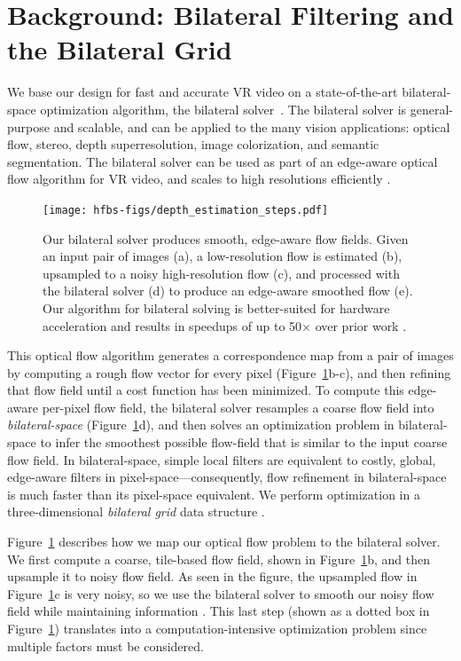 \section{Background: Bilateral Filtering and the Bilateral Grid}

\label{sec:hfbs-background}

We base our design for fast and accurate VR video on a state-of-the-art bilateral-space optimization algorithm, the bilateral solver~\cite{BarronPoole2016}.
The bilateral solver is general-purpose and scalable, and can be applied to the many vision applications: optical flow, stereo, depth superresolution, image colorization, and semantic segmentation.
The bilateral solver can be used as part of an edge-aware optical flow algorithm for VR video, and scales to high resolutions efficiently \cite{googlejump}.

  \begin{figure}[h]
		\centering
		\texttt{[image: hfbs-figs/depth\_estimation\_steps.pdf]}
		\caption{Our bilateral solver produces smooth, edge-aware flow fields.  Given an input pair of images (a), a low-resolution flow is estimated (b),  upsampled to a noisy high-resolution flow (c), and processed with the bilateral solver (d)  to produce an edge-aware smoothed flow (e). Our algorithm for bilateral solving is better-suited for hardware acceleration and results in speedups of up to 50$\times$ over prior work \cite{googlejump, BarronPoole2016}.}
		\label{fig:teaser}
  \end{figure}

This optical flow algorithm generates a correspondence map from a pair of images by computing a rough flow vector for every pixel (Figure~\ref{fig:teaser}b-c), and then refining that flow field until a cost function has been minimized.
To compute this edge-aware per-pixel flow field, the bilateral solver resamples a coarse flow field into \emph{bilateral-space} (Figure~\ref{fig:teaser}d), and then solves an optimization problem in bilateral-space to infer the smoothest possible flow-field that is similar to the input coarse flow field.
In bilateral-space, simple local filters are equivalent to costly, global, edge-aware filters in pixel-space---consequently, flow refinement in bilateral-space is much faster than its pixel-space equivalent.
We perform optimization in a three-dimensional \emph{bilateral grid} data structure \cite{Chen2007}.

Figure~\ref{fig:teaser} describes how we map our optical flow problem to the bilateral solver. We first compute a coarse, tile-based flow field, shown in Figure~\ref{fig:teaser}b, and then upsample it to noisy flow field. As seen in the figure, the upsampled flow in Figure~\ref{fig:teaser}c is very noisy, so we use the bilateral solver to smooth our noisy flow field while maintaining information . This last step (shown as a dotted box in Figure~\ref{fig:teaser}) translates into a computation-intensive optimization problem since multiple factors must be considered.

